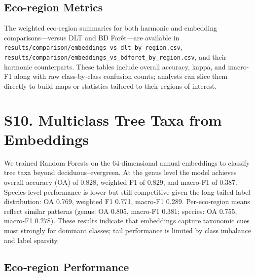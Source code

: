 \documentclass[utf8]{frontiers_suppmat}
\begin{document}
\subsection{Eco-region Metrics}

The weighted eco-region summaries for both harmonic and embedding comparisons—versus DLT and BD For\^{e}t—are available in \texttt{results/comparison/embeddings\_vs\_dlt\_by\_region.csv}, \texttt{results/comparison/embeddings\_vs\_bdforet\_by\_region.csv}, and their harmonic counterparts. These tables include overall accuracy, kappa, and macro-F1 along with raw class-by-class confusion counts; analysts can slice them directly to build maps or statistics tailored to their regions of interest.

\section{S10. Multiclass Tree Taxa from Embeddings}

We trained Random Forests on the 64‑dimensional annual embeddings to classify tree taxa beyond deciduous–evergreen. At the genus level the model achieves overall accuracy (OA) of 0.828, weighted F1 of 0.829, and macro‑F1 of 0.387. Species‑level performance is lower but still competitive given the long‑tailed label distribution: OA 0.769, weighted F1 0.771, macro‑F1 0.289. Per‑eco‑region means reflect similar patterns (genus: OA 0.805, macro‑F1 0.381; species: OA 0.755, macro‑F1 0.278). These results indicate that embeddings capture taxonomic cues most strongly for dominant classes; tail performance is limited by class imbalance and label sparsity.

\subsection*{Eco‑region Performance}
\end{document}
